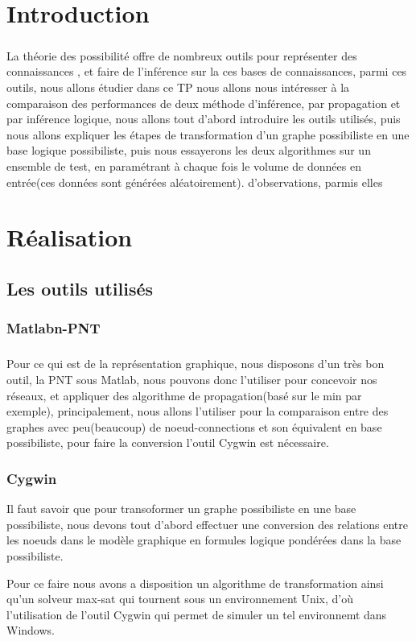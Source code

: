 \documentclass[]{report}
\begin{document}
	 
	
	\tableofcontents

	\listoffigures

	
	\chapter{Introduction }
	\paragraph{}
	La théorie des possibilité offre de nombreux outils pour représenter des connaissances , et faire de l'inférence sur la ces bases de connaissances, parmi ces outils, nous allons étudier dans ce TP nous allons nous intéresser à la comparaison des performances de deux
	méthode d'inférence, par propagation et par inférence logique, nous allons tout d'abord introduire les outils utilisés, puis nous allons expliquer les étapes de transformation d'un graphe possibiliste en une base logique possibiliste, puis nous essayerons les deux algorithmes sur un ensemble de test, en paramétrant à chaque fois le volume de données en entrée(ces données sont générées aléatoirement).
	d'observations, parmis elles 
	\chapter{Réalisation}
	\section{Les outils utilisés}
	\subsection{Matlabn-PNT}
	\paragraph{}
	Pour ce qui est de la représentation graphique, nous disposons d'un très bon outil, la PNT sous Matlab, nous pouvons donc l'utiliser pour concevoir nos réseaux, et appliquer des algorithme de propagation(basé sur le min par exemple), principalement, nous allons l'utiliser pour la comparaison entre des graphes avec peu(beaucoup) de noeud-connections
	et son équivalent en base possibiliste, pour faire la conversion l'outil Cygwin est nécessaire.
	\subsection{Cygwin}
	 Il faut savoir que pour transoformer un graphe possibiliste en une base possibiliste, nous devons tout d'abord effectuer une conversion des relations entre les noeuds dans le modèle graphique en formules logique pondérées dans la base possibiliste.
	 \par 
	 Pour ce faire nous avons a disposition un algorithme de transformation ainsi qu'un solveur max-sat qui tournent sous un environnement Unix, d'où l'utilisation de l'outil Cygwin qui permet de simuler un tel environnemt dans Windows.
	 
\end{document}
